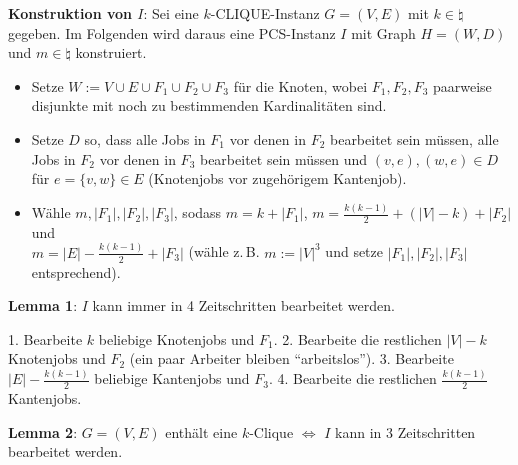 \linie

\textbf{Konstruktion von $I$}:
Sei eine $k$-CLIQUE-Instanz $G = (V, E)$ mit $k \in \natural$ gegeben.
Im Folgenden wird daraus eine PCS-Instanz $I$
mit Graph $H = (W, D)$ und $m \in \natural$ konstruiert.
\begin{itemize}
    \item
    Setze $W := V \cup E \cup F_1 \cup F_2 \cup F_3$ für die Knoten,
    wobei $F_1, F_2, F_3$ paarweise disjunkte  mit noch zu bestimmenden
    Kardinalitäten sind.

    \item
    Setze $D$ so, dass
    alle Jobs in $F_1$ vor denen in $F_2$ bearbeitet sein müssen,
    alle Jobs in $F_2$ vor denen in $F_3$ bearbeitet sein müssen und
    $(v, e), (w, e) \in D$ für $e = \{v, w\} \in E$
    (Knotenjobs vor zugehörigem Kantenjob).

    \item
    Wähle $m, |F_1|, |F_2|, |F_3|$, sodass
    $m = k + |F_1|$, $m = \frac{k(k-1)}{2} + (|V| - k) + |F_2|$ und\\
    $m = |E| - \frac{k(k-1)}{2} + |F_3|$
    (wähle z.\,B. $m := |V|^3$ und setze $|F_1|, |F_2|, |F_3|$ entsprechend).
\end{itemize}

\linie

\textbf{Lemma 1}:
$I$ kann immer in 4 Zeitschritten bearbeitet werden.

\begin{Beweis}
    1. Bearbeite $k$ beliebige Knotenjobs und $F_1$.
    2. Bearbeite die restlichen $|V| - k$ Knotenjobs und $F_2$
    (ein paar Arbeiter bleiben "`arbeitslos"').
    3. Bearbeite $|E| - \frac{k(k-1)}{2}$ beliebige Kantenjobs und $F_3$.
    4. Bearbeite die restlichen $\frac{k(k-1)}{2}$ Kantenjobs.
\end{Beweis}

\textbf{Lemma 2}:
$G = (V, E)$ enthält eine $k$-Clique $\iff$ $I$ kann in 3 Zeitschritten bearbeitet werden.

